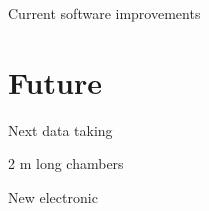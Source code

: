 \documentclass[10pt]{beamer}
\begin{document}
\begin{frame}{Current software improvements}
\end{frame}

\section{Future}

\begin{frame}{Next data taking}
\end{frame}

\begin{frame}{2 m long chambers}
\end{frame}

\begin{frame}{ New electronic}
\end{frame}
\end{document}
